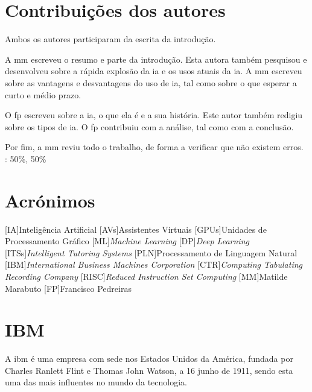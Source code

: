 \documentclass{report}
\begin{document}
\chapter*{Contribuições dos autores}

	Ambos os autores participaram da escrita da introdução.
	
	A \ac{mm} escreveu o resumo e parte da introdução. Esta autora também pesquisou e desenvolveu sobre a rápida explosão da \ac{ia} e os usos atuais da \ac{ia}. A \ac{mm} escreveu sobre as vantagens e desvantagens do uso de \ac{ia}, tal como sobre o que esperar a curto e médio prazo.
	
	O \ac{fp} escreveu sobre a \ac{ia}, o que ela é e a sua história. Este autor também redigiu sobre os tipos de \ac{ia}. O \ac{fp} contribuiu com a análise, tal como com a conclusão.
	
	Por fim, a \ac{mm} reviu todo o trabalho, de forma a verificar que não existem erros.\\

\autores : 50\%, 50\%\\


\chapter*{Acrónimos}
\begin{acronym}
[IA]{Inteligência Artificial}
[AVs]{Assistentes Virtuais}
[GPUs]{Unidades de Processamento Gráfico}
[ML]{\textit{Machine Learning}}
[DP]{\textit{Deep Learning}}
[ITSs]{\textit{Intelligent Tutoring Systems}}
[PLN]{Processamento de Linguagem Natural}
[IBM]{\textit{International Business Machines Corporation}}
[CTR]{\textit{Computing Tabulating Recording Company}}
[RISC]{\textit{Reduced Instruction Set Computing}}
[MM]{Matilde Marabuto}
[FP]{Francisco Pedreiras}
\end{acronym}


\printbibliography

\appendix
\chapter{IBM}
\label{ibm}

    A \ac{ibm} é uma empresa com sede nos Estados Unidos da América, fundada por Charles Ranlett Flint e Thomas John Watson, a 16 junho de 1911, sendo esta uma das mais influentes no mundo da tecnologia.
    
\end{document}
